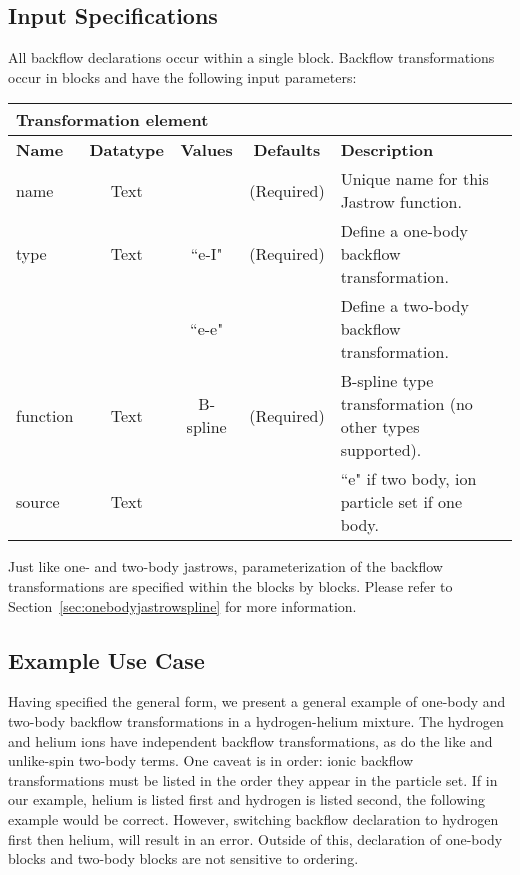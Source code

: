 \subsection{Input Specifications}
All backflow declarations occur within a single  block.  Backflow transformations occur in  blocks and have the following input parameters:

\begin{table}[h]
\begin{center}
\begin{tabular}{l c c c l }
\hline
\multicolumn{5}{l}{Transformation element} \\
\hline
\bfseries Name & \bfseries Datatype & \bfseries Values & \bfseries Defaults  & \bfseries Description \\
\hline
name & Text &  & (Required) & Unique name for this Jastrow function. \\
type & Text & ``e-I" & (Required) & Define a one-body backflow transformation. \\ 
        &          & ``e-e" & & Define a two-body backflow transformation. \\
function & Text & B-spline & (Required) & B-spline type transformation (no other types supported). \\
source & Text &  &  & ``e" if two body, ion particle set if one body.\\ 
  \hline
\end{tabular}
\end{center}
\end{table}

Just like one- and two-body jastrows, parameterization of the backflow transformations are specified within the  blocks by   blocks.  Please refer to Section~\ref{sec:onebodyjastrowspline} for more information.

\subsection{Example Use Case}
Having specified the general form, we present a general example of one-body and two-body backflow transformations in a hydrogen-helium mixture.  The hydrogen and helium ions have independent backflow transformations, as do the like and unlike-spin two-body terms.  One caveat is in order:  ionic backflow transformations must be listed in the order they appear in the particle set.  If in our example, helium is listed first and hydrogen is listed second, the following example would be correct.  However, switching backflow declaration to hydrogen first then helium, will result in an error.  Outside of this, declaration of one-body blocks and two-body blocks are not sensitive to ordering.  

